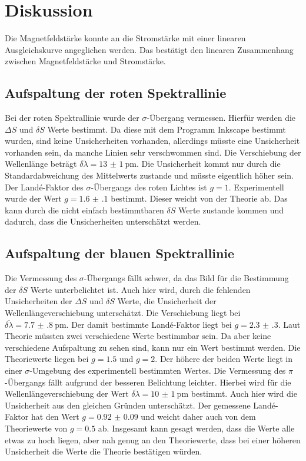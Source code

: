 \section{Diskussion}

Die Magnetfeldstärke konnte an die Stromstärke mit einer linearen Ausgleichskurve angeglichen werden. 
Das bestätigt den linearen Zusammenhang zwischen Magnetfeldstärke und Stromstärke.

\subsection{Aufspaltung der roten Spektrallinie}

Bei der roten Spektrallinie wurde der $\sigma$-Übergang vermessen. Hierfür werden die $\Delta S$ und $\delta S$ 
Werte bestimmt. Da diese mit dem Programm Inkscape \cite{Inkscape} bestimmt wurden, sind keine Unsicherheiten vorhanden, allerdings 
müsste eine Unsicherheit vorhanden sein, da manche Linien sehr verschwommen sind. Die Verschiebung der Wellenlänge 
beträgt $\overline{\delta\lambda} = \SI{13(1)}{\pico\meter}$. Die Unsicherheit kommt nur durch die Standardabweichung des 
Mittelwerts zustande und müsste eigentlich höher sein.
Der Landé-Faktor des $\sigma$-Übergangs des roten Lichtes ist $g=1$. Experimentell wurde der Wert $g=\num{1.6(1)}$ 
bestimmt. Dieser weicht von der Theorie ab. Das kann durch die nicht einfach bestimmtbaren $\delta S$ Werte zustande kommen und 
dadurch, dass die Unsicherheiten unterschätzt werden.

\subsection{Aufspaltung der blauen Spektrallinie}

Die Vermessung des $\sigma$-Übergangs fällt schwer, da das Bild für die Bestimmung der $\delta S$ Werte unterbelichtet ist.
Auch hier wird, durch die fehlenden Unsicherheiten der $\Delta S$ und $\delta S$ Werte, die Unsicherheit der 
Wellenlängeverschiebung unterschätzt. Die Verschiebung liegt bei $\overline{\delta\lambda} = \SI{7.7(8)}{\pico\meter}$.
Der damit bestimmte Landé-Faktor liegt bei $g=\num{2.3(3)}$. Laut Theorie müssten zwei verschiedene Werte bestimmbar sein.
Da aber keine verschiedene Aufspaltung zu sehen sind, kann nur ein Wert bestimmt werden. Die Theoriewerte liegen bei 
$g=\num{1.5}$ und $g=2$. Der höhere der beiden Werte liegt in einer $\sigma$-Umgebung des experimentell bestimmten Wertes.
Die Vermessung des $\pi$-Übergangs fällt aufgrund der besseren Belichtung leichter.
Hierbei wird für die Wellenlängeverschiebung der Wert $\overline{\delta\lambda} = \SI{10(1)}{\pico\meter}$ bestimmt. 
Auch hier wird die Unsicherheit aus den gleichen Gründen unterschätzt.
Der gemessene Landé-Faktor hat den Wert $g=\num{0.92(9)}$ und weicht daher auch von dem Theoriewerte von $g=\num{0.5}$ ab.
Insgesamt kann gesagt werden, dass die Werte alle etwas zu hoch liegen, aber nah genug an den Theoriewerte, dass bei einer 
höheren Unsicherheit die Werte die Theorie bestätigen würden. 